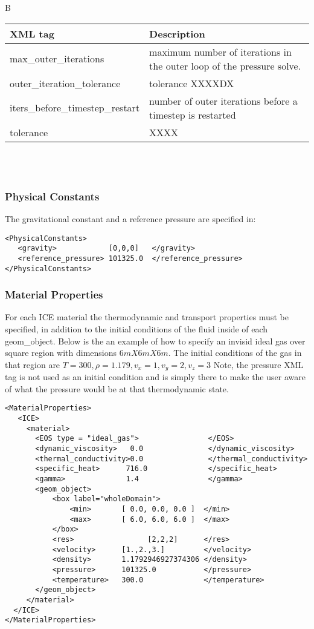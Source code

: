 %
B
\noindent
\footnotesize
\begin{tabular}{l p{8cm}}
XML tag &  Description\\
\hline
\hline
max\_outer\_iterations           &  maximum number of iterations in the outer loop of the pressure solve.\\
outer\_iteration\_tolerance      &  tolerance XXXXDX\\
iters\_before\_timestep\_restart &  \footnotesize number of outer iterations before a timestep is restarted\\
tolerance                        &   XXXX\\
\hline
\end{tabular}
\normalsize\\
\\
\subsubsection{Physical Constants}
The gravitational constant and a reference pressure are specified in:
\begin{Verbatim}[fontsize=\footnotesize]
<PhysicalConstants>
   <gravity>            [0,0,0]   </gravity>
   <reference_pressure> 101325.0  </reference_pressure>
</PhysicalConstants>
\end{Verbatim}
%
\subsubsection{Material Properties}
For each ICE material the thermodynamic and transport properties must be
specified, in addition to the initial conditions of the fluid inside of
each geom\_object.  Below is the an example of how to specify an invisid
ideal gas over square region with dimensions $6m X 6m X 6m$.  The initial
conditions of the gas in that region are $T=300, \rho=1.179, v_x=1,v_y=2,
v_z=3$ \big{(}Note, the pressure XML tag is not used as an initial condition
and is simply there to make the user aware of what the pressure would be at
that thermodynamic state.\big{)}
%
\begin{Verbatim}[fontsize=\footnotesize]
<MaterialProperties>
   <ICE>
     <material>
       <EOS type = "ideal_gas">                </EOS>
       <dynamic_viscosity>   0.0               </dynamic_viscosity>
       <thermal_conductivity>0.0               </thermal_conductivity>
       <specific_heat>      716.0              </specific_heat>
       <gamma>              1.4                </gamma>
       <geom_object>
           <box label="wholeDomain">
               <min>       [ 0.0, 0.0, 0.0 ]  </min>
               <max>       [ 6.0, 6.0, 6.0 ]  </max>
           </box>
           <res>                 [2,2,2]      </res>
           <velocity>      [1.,2.,3.]         </velocity>
           <density>       1.1792946927374306 </density>
           <pressure>      101325.0           </pressure>     
           <temperature>   300.0              </temperature>
       </geom_object>
     </material>
  </ICE>       
</MaterialProperties>
\end{Verbatim}

